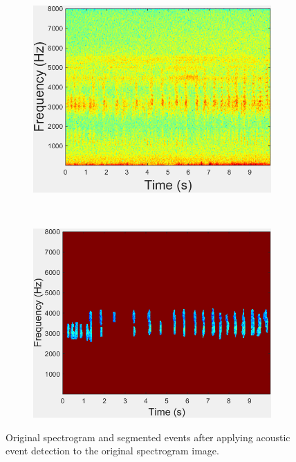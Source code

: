 \begin{figure}[htb!]
\centering
      \begin{subfigure}[b]{0.5\textwidth}
           \includegraphics[width=1\textwidth,height=0.75\textwidth]{image/LR/spectrogram.png}
    \end{subfigure}%
	~~
	      \begin{subfigure}[b]{0.5\textwidth}
           \includegraphics[width=1\textwidth,height=0.75\textwidth]{image/LR/segmentEvents.png}
    \end{subfigure}%
\caption[Acoustic event detection]{Original spectrogram and segmented events after applying acoustic event detection to the original spectrogram image.}
\label{fig:evenets}       %
\end{figure}



